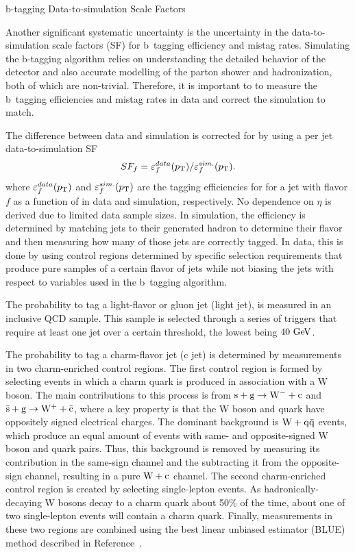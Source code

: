 \begin{section}{b-tagging Data-to-simulation Scale Factors}

Another significant systematic uncertainty is the uncertainty in the data-to-simulation scale factors (SF) for b~tagging efficiency and mistag rates.
Simulating the b-tagging algorithm relies on understanding the detailed behavior of the detector and also accurate modelling of the parton shower and hadronization, both of which are non-trivial.
Therefore, it is important to to measure the b~tagging efficiencies and mistag rates in data and correct the simulation to match.

The difference between data and simulation is corrected for by using a per jet data-to-simulation SF
\begin{align}
SF_{f} = \varepsilon^{data}_{f}(p_{\mathrm{T}})/\varepsilon^{sim.}_{f}(p_{\mathrm{T}}).
\end{align}
where $\varepsilon^{data}_{f}(p_{\mathrm{T}})$ and $\varepsilon^{sim.}_{f}(p_{\mathrm{T}})$ are the tagging efficiencies for for a jet with flavor $f$ as a function of \pT in data and simulation, respectively.
No dependence on $\eta$ is derived due to limited data sample sizes.
In simulation, the efficiency is determined by matching jets to their generated hadron to determine their flavor and then measuring how many of those jets are correctly tagged.
In data, this is done by using control regions determined by specific selection requirements that produce pure samples of a certain flavor of jets while not biasing the jets with respect to variables used in the b~tagging algorithm.

The probability to tag a light-flavor or gluon jet (light jet), is measured in an inclusive QCD sample.
This sample is selected through a series of triggers that require at least one jet over a certain \pT threshold, the lowest being $40~\mathrm{Ge\kern -0.1em V}$.

The probability to tag a charm-flavor jet (c jet) is determined by measurements in two charm-enriched control regions.
The first control region is formed by selecting events in which a charm quark is produced in association with a W boson.
The main contributions to this process is from $\mathrm{s} + \mathrm{g} \to \mathrm{W^{-}} + \mathrm{c}$ and $\mathrm{\bar{s}} + \mathrm{g} \to \mathrm{W^{+}} + \mathrm{\bar{c}}$, where a key property is that the W boson and quark have oppositely signed electrical charges.
The dominant background is $\mathrm{W} + \mathrm{q\bar{q}}$ events, which produce an equal amount of events with same- and opposite-signed W boson and quark pairs.
Thus, this background is removed by measuring its contribution in the same-sign channel and the subtracting it from the opposite-sign channel, resulting in a pure $\mathrm{W} + \mathrm{c}$ channel.
The second charm-enriched control region is created by selecting single-lepton \ttbar events.
As hadronically-decaying W bosons decay to a charm quark about 50\% of the time, about one of two single-lepton \ttbar events will contain a charm quark.
Finally, measurements in these two regions are combined using the best linear unbiased estimator (BLUE) method described in Reference~\cite{LYONS1988110}.


\end{section}
